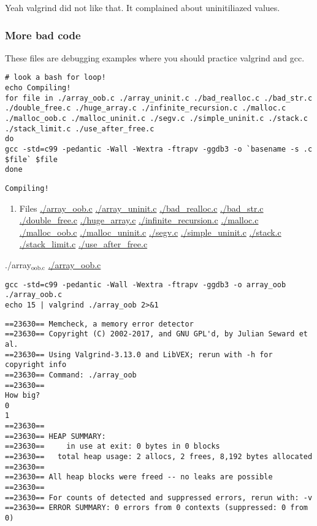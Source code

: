 \documentclass[11pt]{article}
\begin{document}
\begin{enumerate}
Yeah valgrind did not like that. It complained about uninitiliazed values.
\end{enumerate}


\subsubsection{More bad code}
\label{sec:org0448708}

These files are debugging examples where you should practice valgrind
and gcc.

\begin{verbatim}
# look a bash for loop!
echo Compiling!
for file in ./array_oob.c ./array_uninit.c ./bad_realloc.c ./bad_str.c ./double_free.c ./huge_array.c ./infinite_recursion.c ./malloc.c ./malloc_oob.c ./malloc_uninit.c ./segv.c ./simple_uninit.c ./stack.c ./stack_limit.c ./use_after_free.c 
do
gcc -std=c99 -pedantic -Wall -Wextra -ftrapv -ggdb3 -o `basename -s .c $file` $file
done
\end{verbatim}

\begin{verbatim}
Compiling!
\end{verbatim}

\begin{enumerate}
\item Files
\label{sec:org51acad1}
\url{./array\_oob.c}
\url{./array\_uninit.c}
\url{./bad\_realloc.c}
\url{./bad\_str.c}
\url{./double\_free.c}
\url{./huge\_array.c}
\url{./infinite\_recursion.c}
\url{./malloc.c}
\url{./malloc\_oob.c}
\url{./malloc\_uninit.c}
\url{./segv.c}
\url{./simple\_uninit.c}
\url{./stack.c}
\url{./stack\_limit.c}
\url{./use\_after\_free.c}
\end{enumerate}

\item ./array\(_{\text{oob.c}}\)
\label{sec:orgd28f426}
\url{./array\_oob.c}

\begin{verbatim}
gcc -std=c99 -pedantic -Wall -Wextra -ftrapv -ggdb3 -o array_oob ./array_oob.c
echo 15 | valgrind ./array_oob 2>&1
\end{verbatim}

\begin{verbatim}
==23630== Memcheck, a memory error detector
==23630== Copyright (C) 2002-2017, and GNU GPL'd, by Julian Seward et al.
==23630== Using Valgrind-3.13.0 and LibVEX; rerun with -h for copyright info
==23630== Command: ./array_oob
==23630== 
How big?
0
1
==23630== 
==23630== HEAP SUMMARY:
==23630==     in use at exit: 0 bytes in 0 blocks
==23630==   total heap usage: 2 allocs, 2 frees, 8,192 bytes allocated
==23630== 
==23630== All heap blocks were freed -- no leaks are possible
==23630== 
==23630== For counts of detected and suppressed errors, rerun with: -v
==23630== ERROR SUMMARY: 0 errors from 0 contexts (suppressed: 0 from 0)
\end{verbatim}
\end{document}
